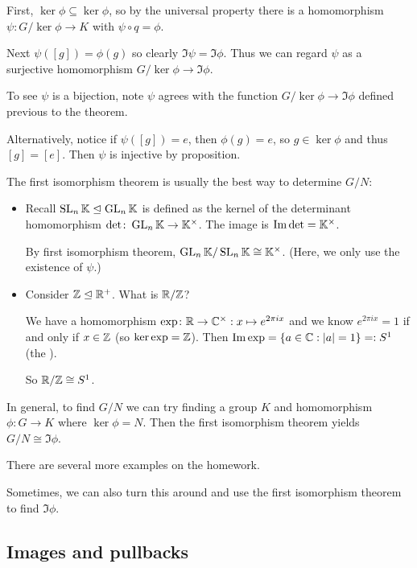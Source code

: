 \documentclass[12pt,letterpaper]{report}
\begin{document}
\begin{thmproof}
  First, $\ker\phi \subseteq \ker\phi$, so by the universal property there is a homomorphism
  $\psi \colon G/\ker\phi \to K$ with $\psi \circ q = \phi$.

  Next $\psi([g]) = \phi(g)$ so clearly $\Im\psi = \Im\phi$.
  Thus we can regard $\psi$ as a surjective homomorphism $G/\ker\phi \to \Im\phi$.

  To see $\psi$ is a bijection, note $\psi$ agrees with the function $G/\ker\phi \to \Im\phi$
  defined previous to the theorem.

  Alternatively, notice if $\psi([g]) = e$, then $\phi(g) = e$, so $g \in \ker\phi$ and thus
  $[g] = [e]$.
  Then $\psi$ is injective by proposition.
\end{thmproof}

\begin{ex}
  The first isomorphism theorem is usually the best way to determine $G/N$:
  \begin{itemize}
    \item
    Recall $\operatorname{SL}_n\mathbb{K} \trianglelefteq \operatorname{GL}_n\mathbb{K}$ is defined as the kernel of the
    determinant homomorphism $\det \colon \operatorname{GL}_n\mathbb{K} \to \mathbb{K}^\times$.
    The image is $\operatorname{Im}\det = \mathbb{K}^\times$.

    By first isomorphism theorem, $\operatorname{GL}_n\mathbb{K} / \operatorname{SL}_n\mathbb{K} \cong \mathbb{K}^\times$.
    (Here, we only use the existence of $\psi$.)
    \item
    Consider $\mathbb{Z} \trianglelefteq \mathbb{R}^+$.
    What is $\mathbb{R}/\mathbb{Z}$?

    We have a homomorphism $\exp \colon \mathbb{R} \to \mathbb{C}^\times : x \mapsto e^{2\pi ix}$
    and we know $e^{2\pi ix} = 1$ if and only if $x \in \mathbb{Z}$ (so $\ker\exp = \mathbb{Z}$).
    Then $\operatorname{Im}\exp = \{a \in \mathbb{C} : \lvert a\rvert = 1\} =: S^1$ (the ).

    So $\mathbb{R}/\mathbb{Z} \cong S^1$.
  \end{itemize}
\end{ex}

In general, to find $G/N$ we can try finding a group $K$ and homomorphism $\phi \colon G \to K$
where $\ker\phi = N$.
Then the first isomorphism theorem yields $G/N \cong \Im\phi$.

There are several more examples on the homework.

Sometimes, we can also turn this around and use the first isomorphism theorem to find $\Im\phi$.

\pagebreak
\subsection{Images and pullbacks}
\end{document}
